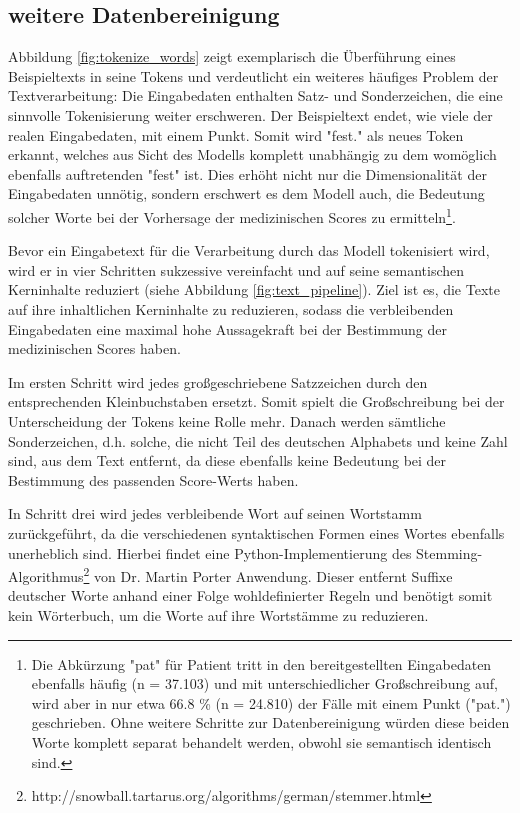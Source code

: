 \subsection{weitere Datenbereinigung}
Abbildung \ref{fig:tokenize_words} zeigt exemplarisch die Überführung eines Beispieltexts in seine Tokens und verdeutlicht ein weiteres häufiges Problem der Textverarbeitung: Die Eingabedaten enthalten Satz- und Sonderzeichen, die eine sinnvolle Tokenisierung weiter erschweren. Der Beispieltext endet, wie viele der realen Eingabedaten, mit einem Punkt. Somit wird "fest." als neues Token erkannt, welches aus Sicht des Modells komplett unabhängig zu dem womöglich ebenfalls auftretenden "fest" ist. Dies erhöht nicht nur die Dimensionalität der Eingabedaten unnötig, sondern erschwert es dem Modell auch, die Bedeutung solcher Worte bei der Vorhersage der medizinischen Scores zu ermitteln\footnote{Die Abkürzung "pat" für Patient tritt in den bereitgestellten Eingabedaten ebenfalls häufig (n = 37.103) und mit unterschiedlicher Großschreibung auf, wird aber in nur etwa 66.8 \% (n = 24.810) der Fälle mit einem Punkt ("pat.") geschrieben. Ohne weitere Schritte zur Datenbereinigung würden diese beiden Worte komplett separat behandelt werden, obwohl sie semantisch identisch sind.}.

Bevor ein Eingabetext für die Verarbeitung durch das Modell tokenisiert wird, wird er in vier Schritten sukzessive vereinfacht und auf seine semantischen Kerninhalte reduziert (siehe Abbildung \ref{fig:text_pipeline}). Ziel ist es, die Texte auf ihre inhaltlichen Kerninhalte zu reduzieren, sodass die verbleibenden Eingabedaten eine maximal hohe Aussagekraft bei der Bestimmung der medizinischen Scores haben.

Im ersten Schritt wird jedes großgeschriebene Satzzeichen durch den entsprechenden Kleinbuchstaben ersetzt. Somit spielt die Großschreibung bei der Unterscheidung der Tokens keine Rolle mehr. 
Danach werden sämtliche Sonderzeichen, d.h. solche, die nicht Teil des deutschen Alphabets und keine Zahl sind, aus dem Text entfernt, da diese ebenfalls keine Bedeutung bei der Bestimmung des passenden Score-Werts haben.

In Schritt drei wird jedes verbleibende Wort auf seinen Wortstamm zurückgeführt, da die verschiedenen syntaktischen Formen eines Wortes ebenfalls unerheblich sind. Hierbei findet eine Python-Implementierung des Stemming-Algorithmus\footnote{http://snowball.tartarus.org/algorithms/german/stemmer.html} von Dr. Martin Porter Anwendung. Dieser entfernt Suffixe deutscher Worte anhand einer Folge wohldefinierter Regeln und benötigt somit kein Wörterbuch, um die Worte auf ihre Wortstämme zu reduzieren.

